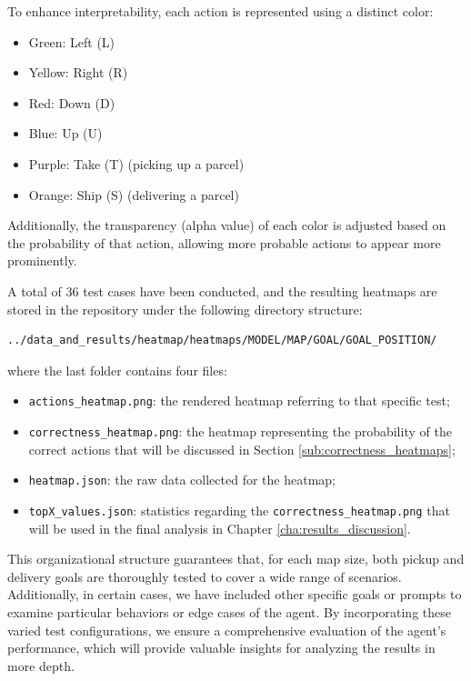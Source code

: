 To enhance interpretability, each action is represented using a distinct color:
\begin{itemize}
  \item Green: Left (L)

  \item Yellow: Right (R)

  \item Red: Down (D)

  \item Blue: Up (U)

  \item Purple: Take (T) (picking up a parcel)

  \item Orange: Ship (S) (delivering a parcel)
\end{itemize}
Additionally, the transparency (alpha value) of each color is adjusted based on
the probability of that action, allowing more probable actions to appear more prominently.

A total of 36 test cases have been conducted, and the resulting heatmaps are
stored in the repository under the following directory structure: \begin{verbatim}
../data_and_results/heatmap/heatmaps/MODEL/MAP/GOAL/GOAL_POSITION/
\end{verbatim}
where the last folder contains four files:
\begin{itemize}
  \item \texttt{actions\_heatmap.png}: the rendered heatmap referring to that specific
    test;

  \item \texttt{correctness\_heatmap.png}: the heatmap representing the probability
    of the correct actions that will be discussed in Section \ref{sub:correctness_heatmaps};

  \item \texttt{heatmap.json}: the raw data collected for the heatmap;

  \item \texttt{topX\_values.json}: statistics regarding the \texttt{correctness\_heatmap.png}
    that will be used in the final analysis in Chapter
    \ref{cha:results_discussion}.
\end{itemize}

This organizational structure guarantees that, for each map size, both pickup and
delivery goals are thoroughly tested to cover a wide range of scenarios.
Additionally, in certain cases, we have included other specific goals or prompts
to examine particular behaviors or edge cases of the agent. By incorporating these
varied test configurations, we ensure a comprehensive evaluation of the agent's
performance, which will provide valuable insights for analyzing the results in more
depth.

